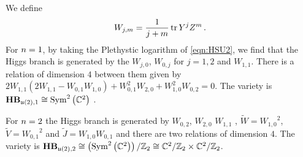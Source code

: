 \documentclass[main.tex]{subfiles}
\begin{document}
We define 
\begin{equation}
W_{j,m}=\frac{1}{j+m}\operatorname{tr} Y^jZ^m\,.
\end{equation}
For ${n}=1$, by taking the Plethystic logarithm of \eqref{eqn:HSU2}, we find that the Higgs branch is generated by the $W_{j,0}$, $W_{0,j}$ for $j=1,2$ and $W_{1,1}$. There is a relation of dimension $4$ between them given by $2W_{1,1}(2W_{1,1}-W_{0,1}W_{1,0})+W_{0,1}^2W_{2,0}+W_{1,0}^2W_{0,2}=0$. The variety is $\mathbf{HB}_{\mathfrak{u}(2),1}\cong\operatorname{Sym}^2\left(\mathbb{C}^2\right)$ \cite{Nakajima:2003pg,Feng:2007ur}.

For ${n}=2$ the Higgs branch is generated by $W_{0,2}$, $W_{2,0}$ $W_{1,1}$ , $\widetilde{W}={W_{1,0}}^2$, $\widetilde{V}={W_{0,1}}^2$ and $\widetilde{J}=W_{1,0}W_{0,1}$ and there are two relations of dimension $4$. The variety is $\mathbf{HB}_{\mathfrak{u}(2),2}\cong\left(\operatorname{Sym}^2\left(\mathbb{C}^2\right)\right)/\mathbb{Z}_2\cong\mathbb{C}^2/\mathbb{Z}_2\times\mathbb{C}^2/\mathbb{Z}_2$.
\end{document}
